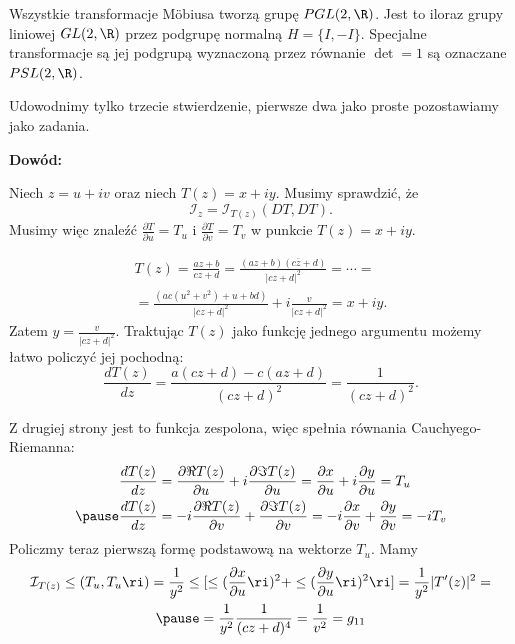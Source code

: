 \begin{frame}

\begin{uwaga}
Wszystkie transformacje M\"obiusa tworzą grupę $PGL(2,\R)$. Jest to iloraz grupy liniowej $GL(2,\R)$ przez podgrupę normalną $H=\{I,-I\}$. Specjalne transformacje są jej podgrupą wyznaczoną przez równanie $\det =1$ są oznaczane $PSL(2,\R)$.
\end{uwaga}

\pause Udowodnimy tylko trzecie stwierdzenie, pierwsze dwa jako proste pozostawiamy jako zadania. 

\textcolor{ared}{\textbf{Dowód:}}\\\pause

Niech $z=u+iv$ oraz niech $T(z)=x+iy$. Musimy sprawdzić, że 
\[\mathcal{I}_z=\mathcal{I}_{T(z)}(DT,DT).\]
\pause Musimy więc znaleźć $\frac{\partial T}{\partial u}=T_u$ i $\frac{\partial T}{\partial v}=T_v$ w punkcie $T(z)=x+iy$.

\end{frame}
\begin{frame}

\begin{multline*}
T(z)=\frac{az+b}{cz+d}=\frac{(az+b)(c\overline{z}+d)}{|cz+d|^2}=\cdots=\\
 =\frac{(ac(u^2+v^2)+u+bd)}{|cz+d|^2}+i\frac{v}{|cz+d|^2}=x+iy.
 \end{multline*}
 Zatem $y=\frac{v}{|cz+d|^2}$. 
\pause\medskip 
 Traktując $T(z)$ jako funkcję jednego argumentu możemy łatwo policzyć jej pochodną:
 \[\frac{dT(z)}{dz}=\frac{a(cz+d)-c(az+d)}{(cz+d)^2}=\frac{1}{(cz+d)^2}.\]

\end{frame}
\begin{frame}

Z drugiej strony jest to funkcja zespolona, więc spełnia równania Cauchyego-Riemanna:
\begin{align*}
\frac{d T(z)}{d z}&=\frac{\partial \Re T(z)}{\partial u}+i\frac{\partial \Im T(z)}{\partial u}=\frac{\partial x}{\partial u}+i\frac{\partial y}{\partial u}=T_u\\\pause
\frac{d T(z)}{d z}&=-i \frac{\partial \Re T(z)}{\partial v}+\frac{\partial \Im T(z)}{\partial v}=-i\frac{\partial x}{\partial v}+\frac{\partial y}{\partial v}=-iT_v\\
\end{align*}
\pause Policzmy teraz pierwszą formę podstawową na wektorze $T_u$. Mamy 
\begin{multline*}
\mathcal{I}_{T(z)}\le(T_u,T_u\ri)=\frac{1}{y^2}\le[\le(\frac{\partial x}{\partial u}\ri)^2+\le(\frac{\partial y}{\partial u}\ri)^2\ri]=\frac{1}{y^2}|T'(z)|^2=\\\pause
=\frac{1}{y^2}\frac{1}{(cz+d)^4}=\frac{1}{v^2}=g_{11}
\end{multline*}
\end{frame}
